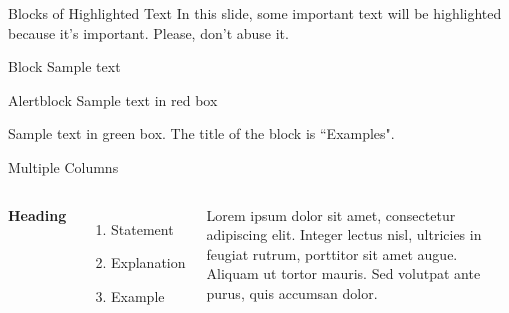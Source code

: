 \documentclass[aspectratio=169,xcolor=dvipsnames]{beamer}
\begin{document}



\begin{frame}{Blocks of Highlighted Text}
    In this slide, some important text will be \alert{highlighted} because it's important. Please, don't abuse it.

    \begin{block}{Block}
        Sample text
    \end{block}

    \begin{alertblock}{Alertblock}
        Sample text in red box
    \end{alertblock}

    \begin{examples}
        Sample text in green box. The title of the block is ``Examples".
    \end{examples}
\end{frame}


\begin{frame}{Multiple Columns}
    \begin{columns}[c] %

        \textbf{Heading}
        \begin{enumerate}
            \item Statement
            \item Explanation
            \item Example
        \end{enumerate}

        Lorem ipsum dolor sit amet, consectetur adipiscing elit. Integer lectus nisl, ultricies in feugiat rutrum, porttitor sit amet augue. Aliquam ut tortor mauris. Sed volutpat ante purus, quis accumsan dolor.

    \end{columns}
\end{frame}

\end{document}
